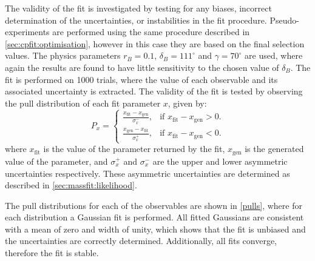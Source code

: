 The validity of the \CP fit is investigated by testing for any biases, incorrect determination of the uncertainties, or instabilities in the \CP fit procedure. Pseudo-experiments are performed using the same procedure described in \sect\ref{sec:cpfit:optimisation}, however in this case they are based on the final selection values. The physics parameters $r_B = 0.1$, $\delta_B = 111^{\circ}$ and $\gamma = 70^{\circ}$ are used, where again the results are found to have little sensitivity to the chosen value of $\delta_B$. The \CP fit is performed on 1000 trials, where the value of each \CP observable and its associated uncertainty is extracted. The validity of the fit is tested by observing the pull distribution of each fit parameter $x$, given by:
\begin{equation*}
P_x = \begin{cases}
	\frac{x_{\text{fit}} - x_{\text{gen}}}{\sigma_x^-}, & \text{if } x_{\text{fit}} - x_{\text{gen}} > 0. \\
	\frac{x_{\text{gen}} - x_{\text{fit}}}{\sigma_x^+}, & \text{if } x_{\text{fit}} - x_{\text{gen}} < 0.
	\end{cases}
\end{equation*}
where $x_{\text{fit}}$ is the value of the parameter returned by the fit, $x_{\text{gen}}$ is the generated value of the parameter, and $\sigma_x^+$ and $\sigma_x^-$ are the upper and lower asymmetric uncertainties respectively. These asymmetric uncertainties are determined as described in \sect\ref{sec:massfit:likelihood}. 

The pull distributions for each of the \CP observables are shown in \fig\ref{pulls}, where for each distribution a Gaussian fit is performed. All fitted Gaussians are consistent with a mean of zero and width of unity, which shows that the \CP fit is unbiased and the uncertainties are correctly determined. Additionally, all fits converge, therefore the fit is stable. 

